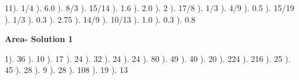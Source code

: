 \documentclass{article}%
\begin{document}
11). 1/4%
). 6.0%
). 8/3%
). 15/14%
). 1.6%
). 2.0%
). 2%
). 17/8%
). 1/3%
). 4/9%
). 0.5%
). 15/19%
). 1/3%
). 0.3%
). 2.75%
). 14/9%
). 10/13%
). 1.0%
). 0.3%
). 0.8%
\newline%
\newpage%
\large%
\begin{center}%
\textbf{Area- Solution 1}%
\newline%
\end{center} \normalsize%
1). 36%
). 10%
). 17%
). 24%
). 32%
). 24%
). 24%
). 80%
). 49%
). 40%
). 20%
). 224%
). 216%
). 25%
). 45%
). 28%
). 9%
). 28%
). 108%
). 19%
). 13%
\end{document}
